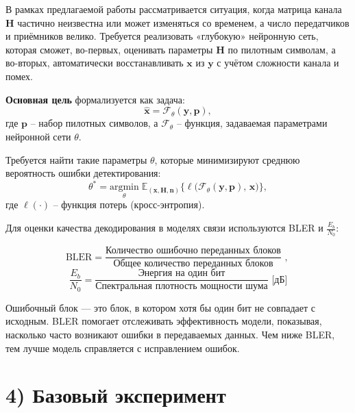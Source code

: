 \documentclass{article}
\begin{document}
В рамках предлагаемой работы рассматривается ситуация, когда матрица канала \(\mathbf{H}\) частично неизвестна или может изменяться со временем, а число передатчиков и приёмников велико. Требуется реализовать «глубокую» нейронную сеть, которая сможет, во-первых, оценивать параметры \(\mathbf{H}\) по пилотным символам, а во-вторых, автоматически восстанавливать \(\mathbf{x}\) из \(\mathbf{y}\) с учётом сложности канала и помех.

\textbf{Основная цель} формализуется как задача:
\begin{equation}
\hat{\mathbf{x}} = \mathcal{F}_\theta(\mathbf{y}, \mathbf{p}),
\end{equation}
где \(\mathbf{p}\) – набор пилотных символов, а \(\mathcal{F}_\theta\) – функция, задаваемая параметрами нейронной сети \(\theta\). 

Требуется найти такие параметры \(\theta\), которые минимизируют среднюю вероятность ошибки детектирования:
\begin{equation}
\theta^* = \underset{\theta}{\mathrm{argmin}} \; \mathbb{E}_{(\mathbf{x},\mathbf{H},\mathbf{n})} 
\Big\{ \ell\big(\mathcal{F}_\theta(\mathbf{y}, \mathbf{p}),\, \mathbf{x}\big) \Big\},
\end{equation}
где \(\ell(\cdot)\) – функция потерь (кросс-энтропия).

Для оценки качества декодирования в моделях связи используются BLER и $\frac{E_b}{N_0}$: 

\begin{equation}
        \text{BLER} = \frac{\text{Количество ошибочно переданных блоков}}{\text{Общее количество переданных блоков}}\text{ , }
        \end{equation}
        \begin{equation}
        \frac{E_b}{N_0} = \frac{\text{Энергия на один бит}}{\text{Спектральная плотность мощности шума}} \text{  [дБ]}
\end{equation}

Ошибочный блок — это блок, в котором хотя бы один бит не совпадает с исходным. BLER помогает отслеживать эффективность модели, показывая, насколько часто возникают ошибки в передаваемых данных. Чем ниже BLER, тем лучше модель справляется с исправлением ошибок.

\bigskip

\section*{4) Базовый эксперимент}
\end{document}

